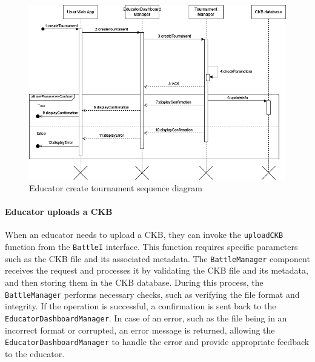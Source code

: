 \begin{figure}[H]
    \begin{center}
        \includegraphics[width=\linewidth]{Images/sequence/Sd_createTournament.png}
        \caption{Educator create tournament sequence diagram}
        \label{fig:Educator_create_tournament}
    \end{center}
\end{figure}

\paragraph{Educator uploads a CKB}
When an educator needs to upload a CKB, they can invoke the \verb|uploadCKB| function from the \verb|BattleI| interface. This function requires specific parameters such as the CKB file and its associated metadata. 
The \verb|BattleManager| component receives the request and processes it by validating the CKB file and its metadata, and then storing them in the CKB database. 
During this process, the \verb|BattleManager| performs necessary checks, such as verifying the file format and integrity. If the operation is successful, a confirmation is sent back to the \verb|EducatorDashboardManager|. 
In case of an error, such as the file being in an incorrect format or corrupted, an error message is returned, allowing the \verb|EducatorDashboardManager| to handle the error and provide appropriate feedback to the educator.

